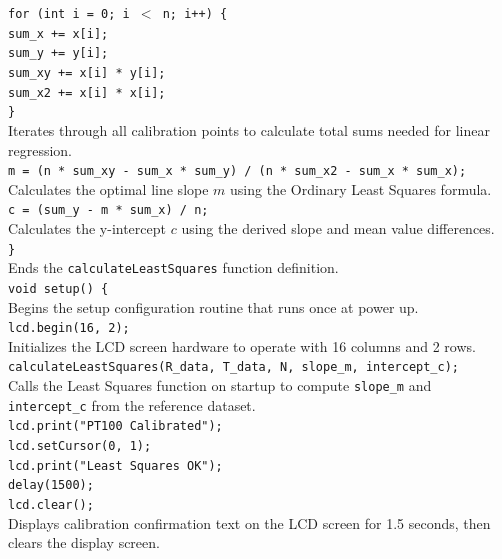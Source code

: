 \documentclass[12pt, a4paper]{article}
\begin{document}
	\noindent\texttt{for (int i = 0; i $<$ n; i++) \{}\\
	\hspace*{1em}\texttt{sum\_x += x[i];}\\
	\hspace*{1em}\texttt{sum\_y += y[i];}\\
	\hspace*{1em}\texttt{sum\_xy += x[i] * y[i];}\\
	\hspace*{1em}\texttt{sum\_x2 += x[i] * x[i];}\\
	\texttt{\}}\\
	Iterates through all calibration points to calculate total sums needed for linear regression.
	\\[6pt]
	
	\noindent\texttt{m = (n * sum\_xy - sum\_x * sum\_y) / (n * sum\_x2 - sum\_x * sum\_x);}\\
	Calculates the optimal line slope $m$ using the Ordinary Least Squares formula.
	\\[6pt]
	
	\noindent\texttt{c = (sum\_y - m * sum\_x) / n;}\\
	Calculates the y-intercept $c$ using the derived slope and mean value differences.
	\\[6pt]
	
	\noindent\texttt{\}}\\
	Ends the \texttt{calculateLeastSquares} function definition.
	\\[6pt]
	
	\noindent\texttt{void setup() \{}\\
	Begins the setup configuration routine that runs once at power up.
	\\[6pt]
	
	\noindent\texttt{lcd.begin(16, 2);}\\
	Initializes the LCD screen hardware to operate with 16 columns and 2 rows.
	\\[6pt]
	
	\noindent\texttt{calculateLeastSquares(R\_data, T\_data, N, slope\_m, intercept\_c);}\\
	Calls the Least Squares function on startup to compute \texttt{slope\_m} and \texttt{intercept\_c} from the reference dataset.
	\\[6pt]
	
	\noindent\texttt{lcd.print("PT100 Calibrated");}\\
	\texttt{lcd.setCursor(0, 1);}\\
	\texttt{lcd.print("Least Squares OK");}\\
	\texttt{delay(1500);}\\
	\texttt{lcd.clear();}\\
	Displays calibration confirmation text on the LCD screen for 1.5 seconds, then clears the display screen.
	\\[6pt]
	
\end{document}
